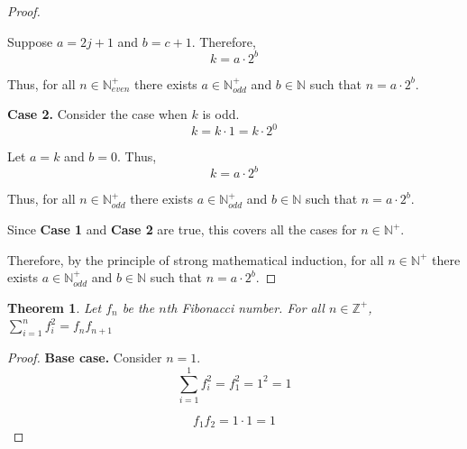 \documentclass{article}
\newtheorem{theorem}{Theorem}
\numberwithin{subcase}{case}
\begin{document}
\begin{outline}[enumerate]
\begin{proof}
\begin{adjustwidth}{0.5cm}{0cm}
            Suppose $a = 2j + 1$ and $b = c + 1$. Therefore, 
            \begin{equation}
                k = a\cdot 2^b
            \end{equation}

            Thus, for all $n \in \mathbb{N}^+_{even}$ there exists $a \in \mathbb{N}^+_{odd}$ and $b \in \mathbb{N}$ such that $n = a\cdot 2^b$.

            \textbf{Case 2.} Consider the case when $k$ is odd. 
            \begin{equation}
                k = k \cdot 1 = k \cdot 2^0
            \end{equation}

            Let $a = k$ and $b = 0$. Thus, 
            \begin{equation}
                k = a \cdot 2^b
            \end{equation}

            Thus, for all $n \in \mathbb{N}^+_{odd}$ there exists $a \in \mathbb{N}^+_{odd}$ and $b \in \mathbb{N}$ such that $n = a\cdot 2^b$.

        \end{adjustwidth}
            
        Since \textbf{Case 1} and \textbf{Case 2} are true, this covers all the cases for 
        $n \in \mathbb{N}^+$. 

        Therefore, by the principle of strong mathematical induction, for all $n \in \mathbb{N}^+$ there 
        exists $a \in \mathbb{N}^+_{odd}$ and $b \in \mathbb{N}$ such that $n = a\cdot 2^b$.

    \end{proof}

    \1 \begin{theorem}
        Let $f_n$ be the $n$th Fibonacci number. For all $n \in \mathbb{Z}^+$, $\sum^{n}_{i=1} f_i^2 = f_nf_{n+1}$
    \end{theorem}

    \begin{proof}
        \textbf{Base case.} Consider $n = 1$. 
        \begin{equation}
            \sum^{1}_{i=1} f_i^2 = f_1^2 = 1^2 = 1           
        \end{equation}

        \begin{equation}
            f_1f_2 = 1\cdot 1 = 1
        \end{equation}


\end{proof}
\end{outline}
\end{document}
